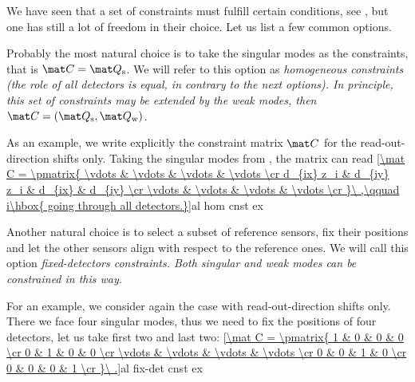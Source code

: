 We have seen that a set of constraints must fulfill certain conditions, see , but one has still a lot of freedom in their choice. Let us list a few common options.

\> Probably the most natural choice is to take the singular modes as the constraints, that is $\mat C = \mat Q_{\rm s}$. We will refer to this option as \em{homogeneous constraints} (the role of all detectors is equal, in contrary to the next options). In principle, this set of constraints may be extended by the weak modes, then $\mat C = (\mat Q_{\rm s}, \mat Q_{\rm w})$.
\par\parindent\itindent\indent\hang As an example, we write explicitly the constraint matrix $\mat C$ for the read-out-direction shifts only. Taking the singular modes from , the matrix can read
\eqref{\mat C = \pmatrix{
	\vdots		& \vdots		& \vdots	& \vdots \cr
	d_{ix} z_i	& d_{iy} z_i	& d_{ix}	& d_{iy} \cr
	\vdots		& \vdots		& \vdots	& \vdots \cr
}\ ,\qquad i\hbox{ going through all detectors.}}{al hom cnst ex}

\> Another natural choice is to select a subset of reference sensors, fix their positions and let the other sensors align with respect to the reference ones. We will call this option \em{fixed-detectors constraints}. Both singular and weak modes can be constrained in this way.
\par\parindent\itindent\indent\hang For an example, we consider again the case with read-out-direction shifts only. There we face four singular modes, thus we need to fix the positions of four detectors, let us take first two and last two:
\eqref{\mat C = \pmatrix{
	1		& 0			& 0 		& 0 		\cr
	0		& 1			& 0 		& 0 		\cr
	\vdots	& \vdots	& \vdots	& \vdots	\cr
	0		& 0			& 1 		& 0 		\cr
	0		& 0			& 0 		& 1 		\cr
}\ .}{al fix-det cnst ex}

